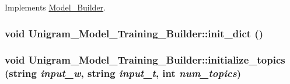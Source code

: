 Implements \hyperlink{class_model___builder_a2cd7a2ce64bdc1377f6deee168e1bcd2}{Model\_\-Builder}.

\hypertarget{class_unigram___model___training___builder_a5916d53b0ba0c60d64697d9e420b7432}{
\subsubsection[{init\_\-dict}]{\setlength{\rightskip}{0pt plus 5cm}void Unigram\_\-Model\_\-Training\_\-Builder::init\_\-dict ()}}
\label{class_unigram___model___training___builder_a5916d53b0ba0c60d64697d9e420b7432}
\hypertarget{class_unigram___model___training___builder_a1ae126c30790abdf2ede9e885dab848d}{
\subsubsection[{initialize\_\-topics}]{\setlength{\rightskip}{0pt plus 5cm}void Unigram\_\-Model\_\-Training\_\-Builder::initialize\_\-topics (string {\em input\_\-w}, \/  string {\em input\_\-t}, \/  int {\em num\_\-topics})}}
\label{class_unigram___model___training___builder_a1ae126c30790abdf2ede9e885dab848d}


